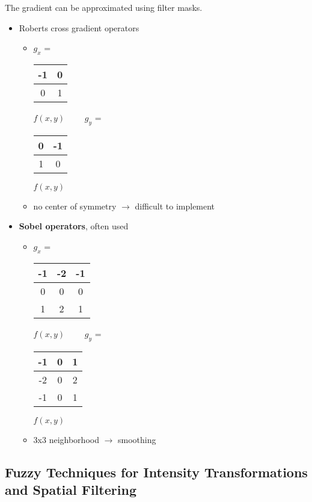 The gradient can be approximated using filter masks.

\begin{itemize}
	\item Roberts cross gradient operators
		\begin{itemize}
		\item $g_x$ = \begin{tabular}{|c|c|} \hline
		-1 & 0 \\ \hline
		 0 & 1 \\ \hline
		\end{tabular} 
		\text{\FiveStarOpen} $f(x,y)$
		$\qquad g_y$ = \begin{tabular}{|c|c|} \hline
		 0 &-1 \\ \hline
		 1 & 0 \\ \hline
		\end{tabular}
		\text{\FiveStarOpen} $f(x,y)$
	\item no center of symmetry $\rightarrow$ difficult to implement
	\end{itemize}
		\item  \textbf{Sobel operators}, often used
		\begin{itemize}
		\item $g_x$ =  
        \begin{tabular}{|c|c|c|} \hline
		      -1 &-2 &-1 \\ \hline
		       0 & 0 & 0 \\ \hline
		       1 & 2 & 1 \\ \hline
		    \end{tabular}
		    \text{\FiveStarOpen} $f(x,y)$
		    $\qquad g_y$ = 
        \begin{tabular}{|c|c|c|} \hline
		      -1 & 0 & 1 \\ \hline
	      	-2 & 0 & 2 \\ \hline
	      	-1 & 0 & 1 \\ \hline
		    \end{tabular}
		    \text{\FiveStarOpen} $f(x,y)$
		\item 3x3 neighborhood $\rightarrow$ smoothing
		\end{itemize}
\end{itemize}

\subsection{Fuzzy Techniques for Intensity Transformations and Spatial Filtering }